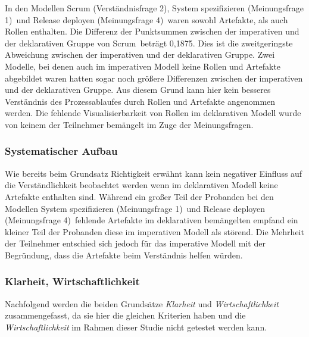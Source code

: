 In den Modellen \grqq Scrum (Verständnisfrage 2)\grqq, \grqq System spezifizieren (Meinungsfrage 1)\grqq \ und \grqq Release deployen (Meinungsfrage 4)\grqq \ waren sowohl Artefakte, als auch Rollen enthalten. Die Differenz der Punktsummen zwischen der imperativen und der deklarativen Gruppe von \grqq Scrum\grqq \ beträgt 0,1875. Dies ist die zweitgeringste Abweichung zwischen der imperativen und der deklarativen Gruppe. Zwei Modelle, bei denen auch im imperativen Modell keine Rollen und Artefakte abgebildet waren hatten sogar noch größere Differenzen zwischen der imperativen und der deklarativen Gruppe. Aus diesem Grund kann hier kein besseres Verständnis des Prozessablaufes durch Rollen und Artefakte angenommen werden. \newline
Die fehlende Visualisierbarkeit von Rollen im deklarativen Modell wurde von keinem der Teilnehmer bemängelt im Zuge der Meinungsfragen.\newline



\subsubsection{Systematischer Aufbau}

Wie bereits beim Grundsatz Richtigkeit erwähnt kann kein negativer Einfluss auf die Verständlichkeit beobachtet werden wenn im deklarativen Modell keine Artefakte enthalten sind.\newline
Während ein großer Teil der Probanden bei den Modellen \grqq System spezifizieren (Meinungsfrage 1)\grqq \ und \grqq Release deployen (Meinungsfrage 4)\grqq \ fehlende Artefakte im deklarativen bemängelten empfand ein kleiner Teil der Probanden diese im imperativen Modell als störend. Die Mehrheit der Teilnehmer entschied sich jedoch für das imperative Modell mit der Begründung, dass die Artefakte beim Verständnis helfen würden. 

\subsubsection{Klarheit, Wirtschaftlichkeit}



Nachfolgend werden die beiden Grundsätze \textit{Klarheit} und \textit{Wirtschaftlichkeit} zusammengefasst, da sie hier die gleichen Kriterien haben und die \textit{Wirtschaftlichkeit} im Rahmen dieser Studie nicht getestet werden kann.\newline


